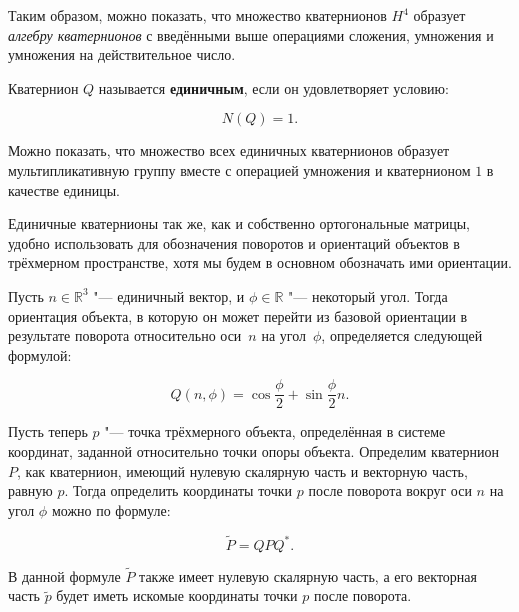 Таким образом, можно показать, что множество кватернионов $H^4$ образует \textit{алгебру кватернионов} с введёнными
выше операциями сложения, умножения и умножения на действительное число.

\begin{definition}
Кватернион $Q$ называется \textbf{единичным}, если он удовлетворяет условию:

$$
N(Q)=1.
$$
\end{definition}

Можно показать, что множество всех единичных кватернионов образует мультипликативную группу вместе с операцией
умножения и кватернионом $1$ в качестве единицы.

Единичные кватернионы так же, как и собственно ортогональные матрицы, удобно использовать для обозначения поворотов и
ориентаций объектов в трёхмерном пространстве, хотя мы будем в основном обозначать ими ориентации.

Пусть $n \in \mathbb{R}^3$ "--- единичный вектор, и $\phi \in \mathbb{R}$ "--- некоторый угол. Тогда ориентация
объекта, в которую он может перейти из базовой ориентации в результате поворота относительно оси~$n$ на угол~$\phi$,
определяется следующей формулой:

$$
Q(n,\phi)=\cos\frac{\phi}{2}+\sin\frac{\phi}{2}n.
$$

Пусть теперь $p$ "--- точка трёхмерного объекта, определённая в системе координат, заданной относительно точки опоры
объекта. Определим кватернион $P$, как кватернион, имеющий нулевую скалярную часть и векторную часть, равную $p$.
Тогда определить координаты точки $p$ после поворота вокруг оси $n$ на угол $\phi$ можно по формуле:

$$
\tilde P=QPQ^*.
$$

В данной формуле $\tilde P$ также имеет нулевую скалярную часть, а его векторная часть $\tilde p$ будет иметь искомые
координаты точки $p$ после поворота.
